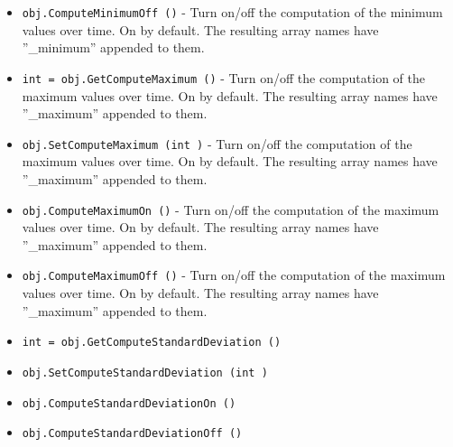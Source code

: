 \begin{itemize}
\item  \verb|obj.ComputeMinimumOff ()| -  Turn on/off the computation of the minimum values over time.  On by
 default.  The resulting array names have ''\_minimum'' appended to them.

\item  \verb|int = obj.GetComputeMaximum ()| -  Turn on/off the computation of the maximum values over time.  On by
 default.  The resulting array names have ''\_maximum'' appended to them.

\item  \verb|obj.SetComputeMaximum (int )| -  Turn on/off the computation of the maximum values over time.  On by
 default.  The resulting array names have ''\_maximum'' appended to them.

\item  \verb|obj.ComputeMaximumOn ()| -  Turn on/off the computation of the maximum values over time.  On by
 default.  The resulting array names have ''\_maximum'' appended to them.

\item  \verb|obj.ComputeMaximumOff ()| -  Turn on/off the computation of the maximum values over time.  On by
 default.  The resulting array names have ''\_maximum'' appended to them.

\item  \verb|int = obj.GetComputeStandardDeviation ()|

\item  \verb|obj.SetComputeStandardDeviation (int )|

\item  \verb|obj.ComputeStandardDeviationOn ()|

\item  \verb|obj.ComputeStandardDeviationOff ()|

\end{itemize}
